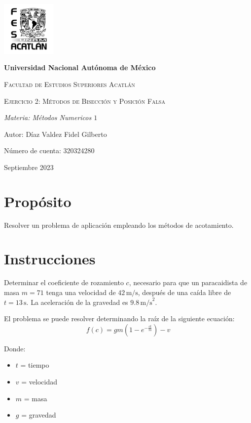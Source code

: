 \documentclass{article}
\begin{document}
    \begin{titlepage}
        
        \centering
        {\includegraphics[width=0.2\textwidth]{logo.png}\par}
        \vspace{1cm}
        {\bfseries\LARGE Universidad Nacional Autónoma de México \par}
        \vspace{1cm}
        {\scshape\Large Facultad de Estudios Superiores Acatlán \par}
        \vspace{3cm}
        {\scshape\Huge Ejercicio 2: Métodos de Bisección y Posición Falsa \par}
        \vspace{3cm}
        {\itshape\Large Materia: Métodos Numericos $1$ \par}
        \vfill
        {\Large Autor: Díaz Valdez Fidel Gilberto \par}
        {\Large Número de cuenta: 320324280 \par}
        \vfill
        {\Large Septiembre 2023 \par}
    \end{titlepage}


\section{Propósito}
Resolver un problema de aplicación empleando los métodos de acotamiento.

\section{Instrucciones}
Determinar el coeficiente de rozamiento \(c\), necesario para que un paracaidista de masa \(m = 71\) tenga una velocidad de \(42 \, \text{m/s}\), después de una caída libre de \(t = 13 \, \text{s}\). La aceleración de la gravedad es \(9.8 \, \text{m/s}^2\).

El problema se puede resolver determinando la raíz de la siguiente ecuación:
\[f(c) = gm\left(1 - e^{-\frac{ct}{m}}\right) - v\]

Donde:
\begin{itemize}
    \item \(t\) = tiempo
    \item \(v\) = velocidad
    \item \(m\) = masa
    \item \(g\) = gravedad
\end{itemize}
\end{document}
